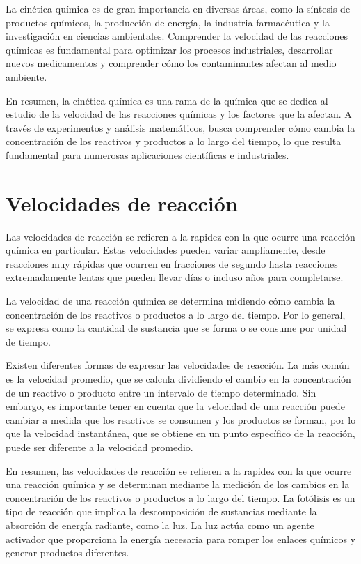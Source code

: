 La cinética química es de gran importancia en diversas áreas, como la síntesis de productos químicos, la producción de energía, la industria farmacéutica y la investigación en ciencias ambientales. Comprender la velocidad de las reacciones químicas es fundamental para optimizar los procesos industriales, desarrollar nuevos medicamentos y comprender cómo los contaminantes afectan al medio ambiente.

En resumen, la cinética química es una rama de la química que se dedica al estudio de la velocidad de las reacciones químicas y los factores que la afectan. A través de experimentos y análisis matemáticos, busca comprender cómo cambia la concentración de los reactivos y productos a lo largo del tiempo, lo que resulta fundamental para numerosas aplicaciones científicas e industriales.

\section{Velocidades de reacción}
Las velocidades de reacción se refieren a la rapidez con la que ocurre una reacción química en particular. Estas velocidades pueden variar ampliamente, desde reacciones muy rápidas que ocurren en fracciones de segundo hasta reacciones extremadamente lentas que pueden llevar días o incluso años para completarse.

La velocidad de una reacción química se determina midiendo cómo cambia la concentración de los reactivos o productos a lo largo del tiempo. Por lo general, se expresa como la cantidad de sustancia que se forma o se consume por unidad de tiempo.

Existen diferentes formas de expresar las velocidades de reacción. La más común es la velocidad promedio, que se calcula dividiendo el cambio en la concentración de un reactivo o producto entre un intervalo de tiempo determinado. Sin embargo, es importante tener en cuenta que la velocidad de una reacción puede cambiar a medida que los reactivos se consumen y los productos se forman, por lo que la velocidad instantánea, que se obtiene en un punto específico de la reacción, puede ser diferente a la velocidad promedio.

En resumen, las velocidades de reacción se refieren a la rapidez con la que ocurre una reacción química y se determinan mediante la medición de los cambios en la concentración de los reactivos o productos a lo largo del tiempo. La fotólisis es un tipo de reacción que implica la descomposición de sustancias mediante la absorción de energía radiante, como la luz. La luz actúa como un agente activador que proporciona la energía necesaria para romper los enlaces químicos y generar productos diferentes.

